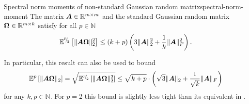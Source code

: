 \documentclass[12pt]{article}
\begin{document}
\begin{lemma}{Spectral norm moments of non-standard Gaussian random matrix}{spectral-norm-moment}
    The matrix $\boldsymbol{A} \in \mathbb{R}^{m \times m}$ and the standard Gaussian random matrix $\boldsymbol{\Omega} \in \mathbb{R}^{m \times k}$ satisfy for all $p \in \mathbb{N}$ 
    \begin{equation}
        \mathbb{E}^{{}^{p}{\mskip -5mu/\mskip -3mu}_{2}}\left[ \lVert \boldsymbol{A} \boldsymbol{\Omega} \rVert _2^2 \right]
        \leq  (k + p) \left( 3 \lVert \boldsymbol{A} \rVert _2^2 + \frac{1}{k} \lVert \boldsymbol{A} \rVert _F^2 \right).
    \end{equation}
\end{lemma}

\begin{remark}
    In particular, this result can also be used to bound
    \begin{equation}
        \mathbb{E}^{p}\left[ \lVert \boldsymbol{A} \boldsymbol{\Omega} \rVert _2 \right] = \sqrt{\mathbb{E}^{{}^{p}{\mskip -5mu/\mskip -3mu}_{2}}\left[ \lVert \boldsymbol{A} \boldsymbol{\Omega} \rVert _2^2 \right]} \leq \sqrt{k + p} \cdot \left(\sqrt{3} \lVert \boldsymbol{A} \rVert _2 + \frac{1}{\sqrt{k}}\lVert \boldsymbol{A} \rVert _F\right)
    \end{equation}
    for any $k,p \in \mathbb{N}$. For $p=2$ this bound is slightly less tight than its equivalent in \cite[lemma B.1]{tropp-2023-randomized-algorithms}.
\end{remark}
\end{document}
